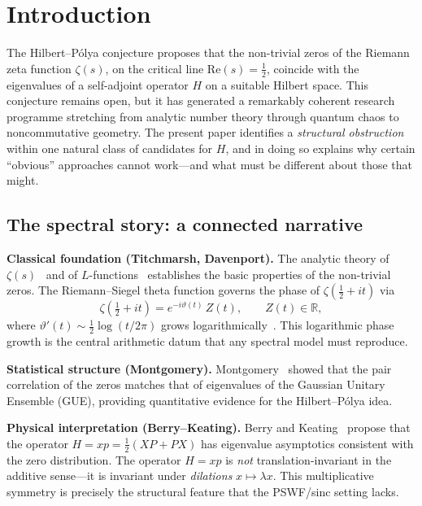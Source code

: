 \documentclass[12pt,a4paper]{amsart}
\theoremstyle{definition}
\begin{document}
\section{Introduction}
\label{sec:intro}

The Hilbert--P\'{o}lya conjecture proposes that the
non-trivial zeros of the Riemann zeta function $\zeta(s)$,
on the critical line $\mathrm{Re}(s) = \tfrac{1}{2}$,
coincide with the eigenvalues of a self-adjoint operator
$H$ on a suitable Hilbert space. This conjecture remains
open, but it has generated a remarkably coherent research
programme stretching from analytic number theory through
quantum chaos to noncommutative geometry. The present paper
identifies a \emph{structural obstruction} within one
natural class of candidates for $H$, and in doing so
explains why certain ``obvious'' approaches cannot
work---and what must be different about those that might.

\subsection*{The spectral story: a connected narrative}

\textbf{Classical foundation (Titchmarsh, Davenport).}
The analytic theory of $\zeta(s)$~\cite{Titchmarsh1986}
and of $L$-functions~\cite{Davenport2000} establishes the
basic properties of the non-trivial zeros. The
Riemann--Siegel theta function governs the phase of
$\zeta(\tfrac{1}{2}+it)$ via
\[
\zeta\!\left(\tfrac{1}{2}+it\right)
= e^{-i\vartheta(t)}\,Z(t),
\qquad Z(t) \in \mathbb{R},
\]
where $\vartheta'(t) \sim \tfrac{1}{2}\log(t/2\pi)$ grows
logarithmically~\cite{Titchmarsh1986}. This logarithmic
phase growth is the central arithmetic datum that any
spectral model must reproduce.

\textbf{Statistical structure (Montgomery).}
Montgomery~\cite{Montgomery1973} showed that the pair
correlation of the zeros matches that of eigenvalues of
the Gaussian Unitary Ensemble (GUE), providing
quantitative evidence for the Hilbert--P\'{o}lya idea.

\textbf{Physical interpretation (Berry--Keating).}
Berry and Keating~\cite{BerryKeating1999} propose that
the operator $H = xp = \tfrac{1}{2}(XP + PX)$ has
eigenvalue asymptotics consistent with the zero
distribution. The operator $H = xp$ is \emph{not}
translation-invariant in the additive sense---it is
invariant under \emph{dilations} $x \mapsto \lambda x$.
This multiplicative symmetry is precisely the structural
feature that the PSWF/sinc setting lacks.
\end{document}
